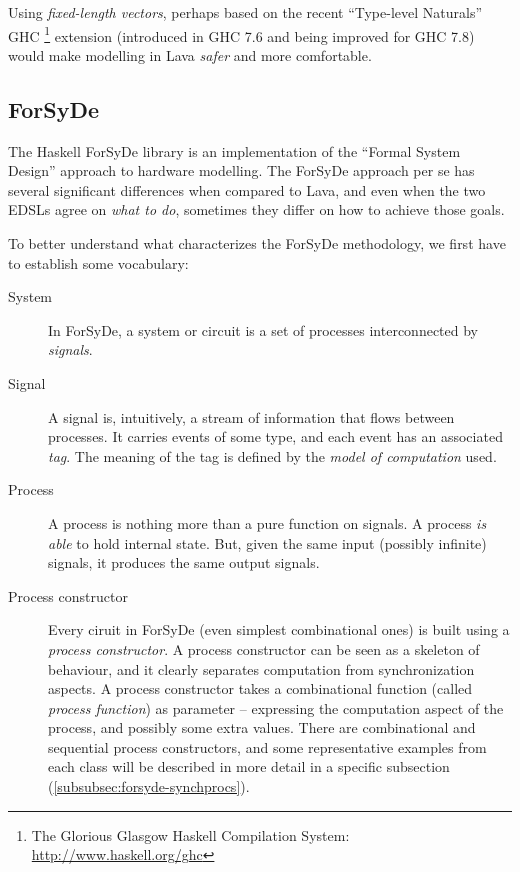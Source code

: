 \documentclass[a4paper]{article}
\begin{document}
                Using \emph{fixed-length vectors}, perhaps based on the recent ``Type-level
                Naturals'' GHC
                \footnote{The Glorious Glasgow Haskell Compilation System:
                    \url{http://www.haskell.org/ghc}}
                extension \cite{website:ghc-typenats}
                (introduced in GHC 7.6 and being improved for GHC 7.8) would make modelling in Lava
                \emph{safer} and more comfortable.


        \subsection{ForSyDe}
        \label{subsec:forsyde}
            The Haskell ForSyDe library is an implementation of the ``Formal System Design''
            approach to hardware modelling\cite{forsyde1999}. The ForSyDe approach per se has
            several significant differences when compared to Lava, and even when the two EDSLs agree
            on \emph{what to do}, sometimes they differ on how to achieve those goals.

            To better understand what characterizes the ForSyDe methodology, we first have to
            establish some vocabulary:

            \begin{description}
                \item[System] In ForSyDe, a system or circuit is a set of processes interconnected
                    by \emph{signals}.

                \item[Signal] A signal is, intuitively, a stream of information that flows between
                    processes. It carries events of some type, and each event has an associated
                    \emph{tag}. The meaning of the tag is defined by the \emph{model of
                        computation} used.

                \item[Process] A process is nothing more than a pure function on signals. A process
                    \emph{is able} to hold internal state. But, given the same input (possibly
                    infinite) signals, it produces the same output signals.

                \item[Process constructor] Every ciruit in ForSyDe (even simplest combinational ones)
                    is built using a \emph{process constructor}. A process constructor can be seen as
                    a skeleton of behaviour, and it clearly separates computation from
                    synchronization aspects. A process constructor takes a combinational function
                    (called \emph{process function}) as parameter -- expressing the computation
                    aspect of the process, and possibly some extra values. There are combinational
                    and sequential process constructors, and some representative examples from each
                    class will be described in more detail in a specific subsection
                    (\ref{subsubsec:forsyde-synchprocs}).
            \end{description}
\end{document}
